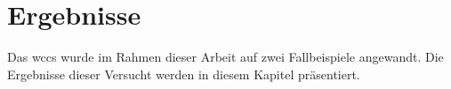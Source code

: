 \chapter{Ergebnisse}
    Das \gls{wccs} wurde im Rahmen dieser Arbeit auf zwei Fallbeispiele angewandt.
    Die Ergebnisse dieser Versucht werden in diesem Kapitel präsentiert.

    \label{chapter:Findings}
    
    
    

